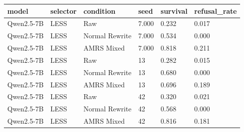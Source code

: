 \begin{tabular}{llllll}
\toprule
model & selector & condition & seed & survival & refusal\_rate \\
\midrule
Qwen2.5-7B & LESS & Raw & 7.000 & 0.232 & 0.017 \\
Qwen2.5-7B & LESS & Normal Rewrite & 7.000 & 0.534 & 0.000 \\
Qwen2.5-7B & LESS & AMRS Mixed & 7.000 & 0.818 & 0.211 \\
Qwen2.5-7B & LESS & Raw & 13 & 0.282 & 0.015 \\
Qwen2.5-7B & LESS & Normal Rewrite & 13 & 0.680 & 0.000 \\
Qwen2.5-7B & LESS & AMRS Mixed & 13 & 0.696 & 0.189 \\
Qwen2.5-7B & LESS & Raw & 42 & 0.320 & 0.021 \\
Qwen2.5-7B & LESS & Normal Rewrite & 42 & 0.568 & 0.000 \\
Qwen2.5-7B & LESS & AMRS Mixed & 42 & 0.816 & 0.181 \\
\bottomrule
\end{tabular}
